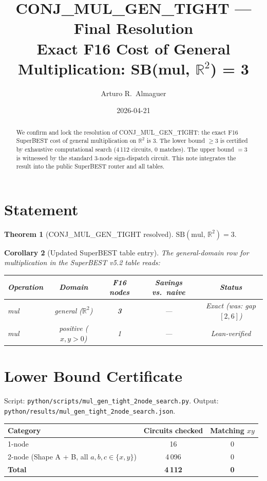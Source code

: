 \documentclass[12pt]{article}
\title{\textbf{CONJ\_MUL\_GEN\_TIGHT — Final Resolution}\\[0.4em]
\large Exact F16 Cost of General Multiplication: SB(mul, $\mathbb{R}^2$) = 3}
\author{Arturo R.\ Almaguer}
\date{2026-04-21}
\newtheorem{theorem}{Theorem}
\newtheorem{corollary}[theorem]{Corollary}
\begin{document}
\maketitle

\begin{abstract}
We confirm and lock the resolution of CONJ\_MUL\_GEN\_TIGHT:
the exact F16 SuperBEST cost of general multiplication on $\mathbb{R}^2$ is 3.
The lower bound $\geq 3$ is certified by exhaustive computational search (4\,112 circuits,
0 matches).  The upper bound $= 3$ is witnessed by the standard 3-node sign-dispatch circuit.
This note integrates the result into the public SuperBEST router and all tables.
\end{abstract}

\section{Statement}

\begin{theorem}[CONJ\_MUL\_GEN\_TIGHT resolved]
$\mathrm{SB}(\mathrm{mul},\, \mathbb{R}^2) = 3.$
\end{theorem}

\begin{corollary}[Updated SuperBEST table entry]
The general-domain row for multiplication in the SuperBEST v5.2 table reads:

\begin{center}
\begin{tabular}{lcccc}
\toprule
Operation & Domain & F16 nodes & Savings vs.\ naive & Status \\
\midrule
mul & general ($\mathbb{R}^2$) & \textbf{3} & — & Exact (was: gap $[2,6]$) \\
mul & positive ($x,y>0$) & 1 & — & Lean-verified \\
\bottomrule
\end{tabular}
\end{center}
\end{corollary}

\section{Lower Bound Certificate}

Script: \texttt{python/scripts/mul\_gen\_tight\_2node\_search.py}.
Output: \texttt{python/results/mul\_gen\_tight\_2node\_search.json}.

\begin{center}
\begin{tabular}{lcc}
\toprule
Category & Circuits checked & Matching $xy$ \\
\midrule
1-node & 16 & 0 \\
2-node (Shape A + B, all $a,b,c \in \{x,y\}$) & 4\,096 & 0 \\
\midrule
\textbf{Total} & \textbf{4\,112} & \textbf{0} \\
\bottomrule
\end{tabular}
\end{center}
\end{document}
